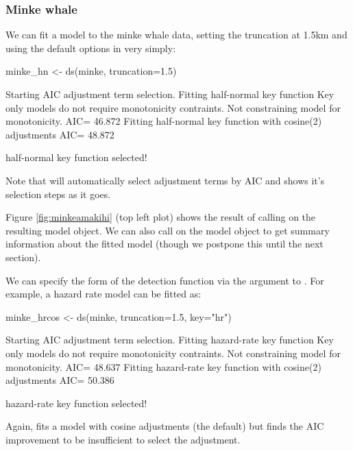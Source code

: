 \documentclass[article]{jss}
\begin{document}
\subsubsection{Minke whale}\label{minke-whale}

We can fit a model to the minke whale data, setting the truncation at
1.5km and using the default options in  very simply:

\begin{CodeChunk}
\begin{CodeInput}
minke_hn <- ds(minke, truncation=1.5)
\end{CodeInput}
\begin{CodeOutput}
Starting AIC adjustment term selection.
Fitting half-normal key function
Key only models do not require monotonicity contraints. Not constraining model for monotonicity.
AIC= 46.872
Fitting half-normal key function with cosine(2) adjustments
AIC= 48.872


half-normal key function selected!
\end{CodeOutput}
\end{CodeChunk}

Note that  will automatically select adjustment terms by AIC
and shows it's selection steps as it goes.

Figure \ref{fig:minkeamakihi} (top left plot) shows the result of
calling  on the resulting model object. We can also call
 on the model object to get summary information about the
fitted model (though we postpone this until the next section).

We can specify the form of the detection function via the 
argument to . For example, a hazard rate model can be fitted
as:

\begin{CodeChunk}
\begin{CodeInput}
minke_hrcos <- ds(minke, truncation=1.5, key="hr")
\end{CodeInput}
\begin{CodeOutput}
Starting AIC adjustment term selection.
Fitting hazard-rate key function
Key only models do not require monotonicity contraints. Not constraining model for monotonicity.
AIC= 48.637
Fitting hazard-rate key function with cosine(2) adjustments
AIC= 50.386


hazard-rate key function selected!
\end{CodeOutput}
\end{CodeChunk}

Again,  fits a model with cosine adjustments (the default) but
finds the AIC improvement to be insufficient to select the adjustment.
\end{document}
